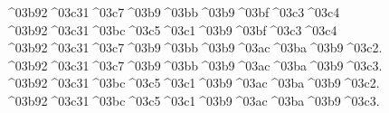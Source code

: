 {%
^^^^03b92^^^^03c31^^^^03c7^^^^03b9^^^^03bb^^^^03b9^^^^03bf^^^^03c3^^^^03c4  		%
%
^^^^03b92^^^^03c31^^^^03bc^^^^03c5^^^^03c1^^^^03b9^^^^03bf^^^^03c3^^^^03c4 		%
%
^^^^03b92^^^^03c31^^^^03c7^^^^03b9^^^^03bb^^^^03b9^^^^03ac^^^^03ba^^^^03b9^^^^03c2. 		%
^^^^03b92^^^^03c31^^^^03c7^^^^03b9^^^^03bb^^^^03b9^^^^03ac^^^^03ba^^^^03b9^^^^03c3.
%
^^^^03b92^^^^03c31^^^^03bc^^^^03c5^^^^03c1^^^^03b9^^^^03ac^^^^03ba^^^^03b9^^^^03c2. 		%
^^^^03b92^^^^03c31^^^^03bc^^^^03c5^^^^03c1^^^^03b9^^^^03ac^^^^03ba^^^^03b9^^^^03c3.
} %
\endinput

